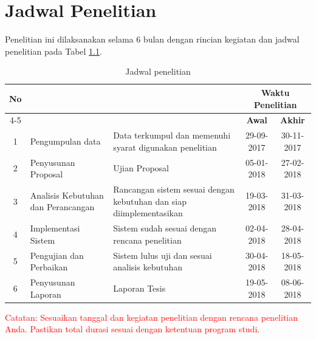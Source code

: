 \chapter{Jadwal Penelitian}

Penelitian ini dilaksanakan selama 6 bulan dengan rincian kegiatan dan jadwal penelitian pada Tabel \ref{tab:jadwal-penelitian}.

\begin{table}[h]
\centering
\caption{Jadwal penelitian}
\label{tab:jadwal-penelitian}
\begin{tabular}{|c|>{\centering\arraybackslash}p{4cm}|>{\centering\arraybackslash}p{4cm}|c|c|}
\hline
\multirow{2}{*}{\textbf{No}} & \multirow{2}{*}{\textbf{Kegiatan}} & \multirow{2}{*}{\textbf{Target}} & \multicolumn{2}{c|}{\textbf{Waktu Penelitian}} \\
\cline{4-5}
& & & \textbf{Awal} & \textbf{Akhir} \\
\hline
1 & Pengumpulan data & Data terkumpul dan memenuhi syarat digunakan penelitian & 29-09-2017 & 30-11-2017 \\
\hline
2 & Penyusunan Proposal & Ujian Proposal & 05-01-2018 & 27-02-2018 \\
\hline
3 & Analisis Kebutuhan dan Perancangan & Rancangan sistem sesuai dengan kebutuhan dan siap diimplementasikan & 19-03-2018 & 31-03-2018 \\
\hline
4 & Implementasi Sistem & Sistem sudah sesuai dengan rencana penelitian & 02-04-2018 & 28-04-2018 \\
\hline
5 & Pengujian dan Perbaikan & Sistem lulus uji dan sesuai analisis kebutuhan & 30-04-2018 & 18-05-2018 \\
\hline
6 & Penyusunan Laporan & Laporan Tesis & 19-05-2018 & 08-06-2018 \\
\hline
\end{tabular}
\end{table}

\textcolor{red}{Catatan: Sesuaikan tanggal dan kegiatan penelitian dengan rencana penelitian Anda. Pastikan total durasi sesuai dengan ketentuan program studi.}
